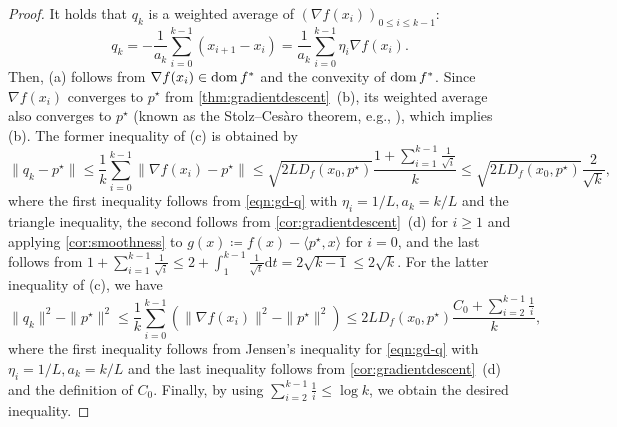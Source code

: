 \documentclass[11pt,a4paper]{article}
\theoremstyle{definition}
\theoremstyle{plain}
\newcommand{\rmd}{{\mathrm{d}}}
\newcommand{\dom}{\mathop{\rm dom}}
\begin{document}
\begin{proof}
    It holds that $q_k$ is a weighted average of $(\nabla f(x_i))_{0 \le i \le k - 1}$:
    \begin{equation}\label{eqn:gd-q}
        q_k = -\frac1{a_k}\sum_{i = 0}^{k - 1}(x_{i + 1} - x_i) = \frac1{a_k}\sum_{i = 0}^{k - 1}\eta_i\nabla f(x_i).
    \end{equation}
    Then, (a) follows from $\nabla f(x_i) \in \dom f^\ast$ and the convexity of $\dom f^\ast$.
    Since $\nabla f(x_i)$ converges to $p^\star$ from \cref{thm:gradientdescent}~(b), its weighted average also converges to $p^\star$ (known as the Stolz--Ces\`{a}ro theorem, e.g., \cite[Chapter~3~Theorem~1.22]{Muresan2008}), which implies (b).
    The former inequality of (c) is obtained by
    \[
        \|q_k - p^\star\|
        \le \frac1k\sum_{i = 0}^{k - 1}\|\nabla f(x_i) - p^\star\|
        \le \sqrt{2LD_f(x_0, p^\star)}\frac{1 + \sum_{i = 1}^{k - 1}\frac1{\sqrt{i}}}k
        \le \sqrt{2LD_f(x_0, p^\star)}\frac2{\sqrt{k}},
    \]
    where the first inequality follows from \eqref{eqn:gd-q} with $\eta_i = 1/L, a_k = k/L$ and the triangle inequality, the second follows from \cref{cor:gradientdescent}~(d) for $i \ge 1$ and applying \cref{cor:smoothness} to $g(x) \coloneqq f(x) - \langle p^\star, x\rangle$ for $i = 0$, and the last follows from $1 + \sum_{i = 1}^{k - 1}\frac1{\sqrt{i}} \le 2 + \int_1^{k - 1}\frac1{\sqrt{t}}\rmd t = 2\sqrt{k - 1} \le 2\sqrt{k}$.
    For the latter inequality of (c), we have
    \[
        \|q_k\|^2 - \|p^\star\|^2 \le \frac1k\sum_{i = 0}^{k - 1}\left(\|\nabla f(x_i)\|^2 - \|p^\star\|^2\right) \le 2LD_f(x_0, p^\star)\frac{C_0 + \sum_{i = 2}^{k - 1}\frac1i}k,
    \]
    where the first inequality follows from Jensen's inequality for \eqref{eqn:gd-q} with $\eta_i = 1/L, a_k = k/L$ and the last inequality follows from \cref{cor:gradientdescent}~(d) and the definition of $C_0$.
    Finally, by using $\sum_{i = 2}^{k - 1}\frac1i \le \log k$, we obtain the desired inequality.
\end{proof}
\end{document}
